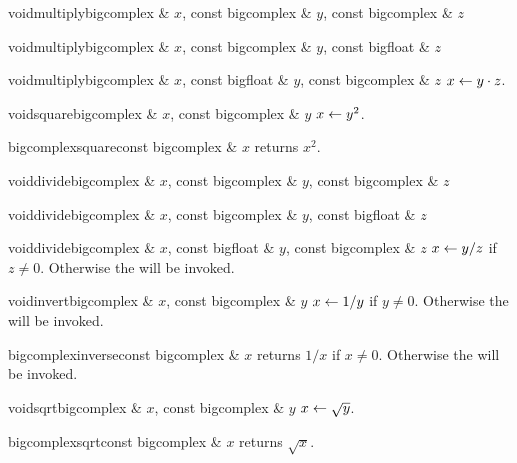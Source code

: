 \begin{fcode}{void}{multiply}{bigcomplex & $x$, const bigcomplex & $y$, const bigcomplex & $z$}\end{fcode}
\begin{fcode}{void}{multiply}{bigcomplex & $x$, const bigcomplex & $y$, const bigfloat & $z$}\end{fcode}
\begin{fcode}{void}{multiply}{bigcomplex & $x$, const bigfloat & $y$, const bigcomplex & $z$}
  $x \leftarrow y \cdot z$.
\end{fcode}

\begin{fcode}{void}{square}{bigcomplex & $x$, const bigcomplex & $y$}
  $x \leftarrow y^2$.
\end{fcode}

\begin{fcode}{bigcomplex}{square}{const bigcomplex & $x$}
  returns $x^2$.
\end{fcode}

\begin{fcode}{void}{divide}{bigcomplex & $x$, const bigcomplex & $y$, const bigcomplex & $z$}\end{fcode}
\begin{fcode}{void}{divide}{bigcomplex & $x$, const bigcomplex & $y$, const bigfloat & $z$}\end{fcode}
\begin{fcode}{void}{divide}{bigcomplex & $x$, const bigfloat & $y$, const bigcomplex & $z$}
  $x \leftarrow y / z$ if $z \neq 0$.  Otherwise the \LEH will be invoked.
\end{fcode}

\begin{fcode}{void}{invert}{bigcomplex & $x$, const bigcomplex & $y$}
  $x \leftarrow 1 / y$ if $y \neq 0$.  Otherwise the \LEH will be invoked.
\end{fcode}

\begin{fcode}{bigcomplex}{inverse}{const bigcomplex & $x$}
  returns $1 / x$ if $x \neq 0$.  Otherwise the \LEH will be invoked.
\end{fcode}

\begin{fcode}{void}{sqrt}{bigcomplex & $x$, const bigcomplex & $y$}
  $x \leftarrow \sqrt{y}$.
\end{fcode}

\begin{fcode}{bigcomplex}{sqrt}{const bigcomplex & $x$}
  returns $\sqrt{x}$.
\end{fcode}

